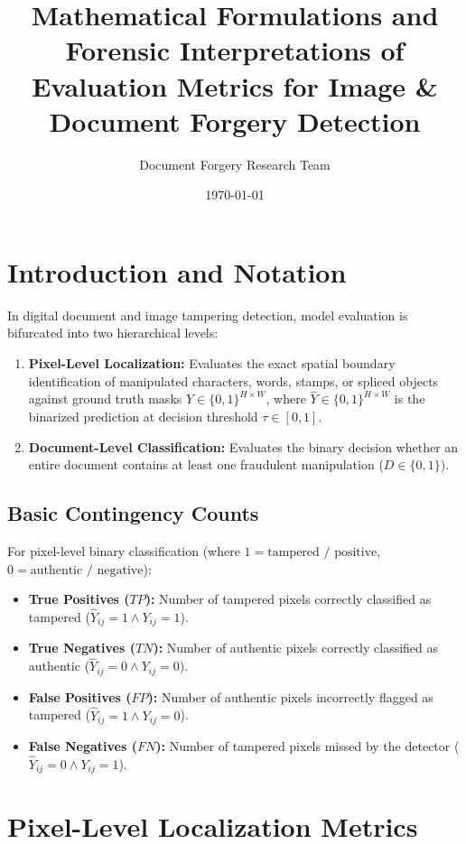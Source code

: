 \documentclass[11pt,a4paper]{article}
\title{\textbf{Mathematical Formulations and Forensic Interpretations of Evaluation Metrics for Image \& Document Forgery Detection}}
\author{Document Forgery Research Team}
\date{\today}
\begin{document}
\maketitle

\section{Introduction and Notation}
In digital document and image tampering detection, model evaluation is bifurcated into two hierarchical levels:
\begin{enumerate}
    \item \textbf{Pixel-Level Localization:} Evaluates the exact spatial boundary identification of manipulated characters, words, stamps, or spliced objects against ground truth masks $Y \in \{0, 1\}^{H \times W}$, where $\hat{Y} \in \{0, 1\}^{H \times W}$ is the binarized prediction at decision threshold $\tau \in [0, 1]$.
    \item \textbf{Document-Level Classification:} Evaluates the binary decision whether an entire document contains at least one fraudulent manipulation ($D \in \{0, 1\}$).
\end{enumerate}

\subsection{Basic Contingency Counts}
For pixel-level binary classification (where $1 = \text{tampered / positive}$, $0 = \text{authentic / negative}$):
\begin{itemize}
    \item \textbf{True Positives ($TP$):} Number of tampered pixels correctly classified as tampered ($\hat{Y}_{ij} = 1 \land Y_{ij} = 1$).
    \item \textbf{True Negatives ($TN$):} Number of authentic pixels correctly classified as authentic ($\hat{Y}_{ij} = 0 \land Y_{ij} = 0$).
    \item \textbf{False Positives ($FP$):} Number of authentic pixels incorrectly flagged as tampered ($\hat{Y}_{ij} = 1 \land Y_{ij} = 0$).
    \item \textbf{False Negatives ($FN$):} Number of tampered pixels missed by the detector ($\hat{Y}_{ij} = 0 \land Y_{ij} = 1$).
\end{itemize}

\section{Pixel-Level Localization Metrics}
\end{document}
